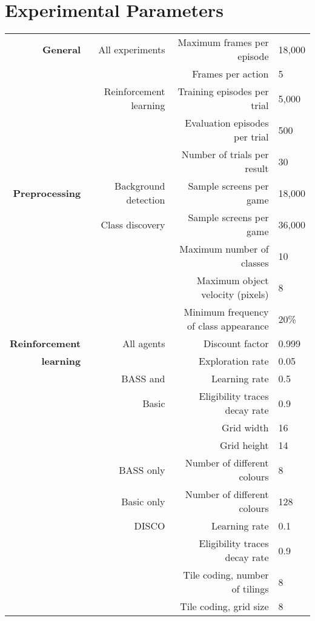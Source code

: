 \documentclass[twoside,11pt]{article}
\begin{document}
\newpage
\section{Experimental Parameters}
\label{appendix:parameters}

\begin{table}[h!]
\small
\begin{center}
\begin{tabular}{|r||r||r|l|}
\hline
\textbf{General} & All experiments & Maximum frames per episode & 18,000 \\
\cline{3-4}
& & Frames per action & 5 \\
\cline{2-4}
& Reinforcement learning & Training episodes per trial & 5,000 \\
\cline{3-4}
& & Evaluation episodes per trial & 500 \\
\cline{3-4}
& & Number of trials per result & 30 \\ 
\hline
\hline
\textbf{Preprocessing} & Background detection & Sample screens per game & 18,000 \\
\cline{2-4}
& Class discovery & Sample screens per game & 36,000 \\
\cline{3-4}
& & Maximum number of classes & 10 \\
\cline{3-4}
& & Maximum object velocity (pixels) & 8 \\
\cline{3-4}
& & Minimum frequency of class appearance & 20\% \\
\hline
\hline
\textbf{Reinforcement} & All agents & Discount factor  & 0.999 \\
\cline{3-4} 
\textbf{learning} & & Exploration rate  & 0.05 \\
\cline{2-4} 

& BASS and & Learning rate  & 0.5 \\
\cline{3-4}
& Basic & Eligibility traces decay rate  & 0.9 \\
\cline{3-4}
& & Grid width & 16 \\
\cline{3-4}
& & Grid height & 14 \\
\cline{2-4}
& BASS only & Number of different colours & 8 \\
\cline{2-4}
& Basic only & Number of different colours & 128 \\
\cline{2-4}

& DISCO & Learning rate  & 0.1 \\
\cline{3-4}
& & Eligibility traces decay rate  & 0.9 \\
\cline{3-4}
& & Tile coding, number of tilings & 8 \\ 
\cline{3-4}
& & Tile coding, grid size & 8 \\ 
\cline{2-4}


\end{tabular}
\end{center}
\end{table}
\end{document}
